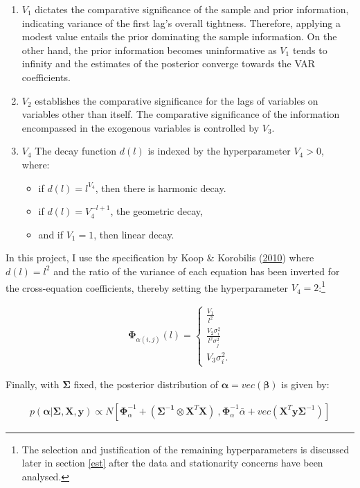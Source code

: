 \documentclass[11pt,preprint, authoryear]{elsarticle}
\numberwithin{equation}{section}
\numberwithin{figure}{section}
\numberwithin{table}{section}
\let\rmarkdownfootnote\footnote%
\def\footnote{\protect\rmarkdownfootnote}
\begin{document}
\begin{enumerate}[label=(\roman*)]
  \item $V_1$ dictates the comparative significance of the sample and prior information, indicating variance of the first lag’s overall tightness. Therefore, applying a modest value entails the prior dominating the sample information. On the other hand, the prior information becomes uninformative as $V_1$ tends to infinity and the estimates of the posterior converge towards the VAR coefficients. 
  \item $V_2$ establishes the comparative significance for the lags of variables on variables other than itself. 
The comparative significance of the information encompassed in the exogenous variables is controlled by $V_3$. 
  \item $V_4$ The decay function $d(l)$ is indexed by the hyperparameter $V_4 > 0$, where:
    \begin{itemize}
      \item if $d(l) = l^{V_4}$, then there is harmonic decay. 
      \item if $d(l) = V_4^{-l+1}$, the geometric decay,
      \item and if $V_1=1$, then linear decay. 
    \end{itemize}
\end{enumerate}

In this project, I use the specification by Koop \& Korobilis
(\protect\hyperlink{ref-koop2010}{2010}) where \(d(l) = l^2\) and the
ratio of the variance of each equation has been inverted for the
cross-equation coefficients, thereby setting the hyperparameter
\(V_4=2\):\footnote{The selection and justification of the remaining
  hyperparameters is discussed later in section \ref{est} after the data
  and stationarity concerns have been analysed.}

\begin{align}
 \bm{\Phi}_{\alpha(i,j)} (l) =
 \begin{cases} 
      \frac{V_1}{ l^2} \\
      \frac{V_2 \sigma^2_i }{l^2 \sigma^2_j}  \label{hyper2} \\
      V_3 \sigma^2_{i}. 
\end{cases}
\end{align}

Finally, with \(\bm{\Sigma}\) fixed, the posterior distribution of
\(\bm{\alpha} = vec(\bm{\beta})\) is given by:

\begin{align}
p(\bm{\alpha} | \bm{\Sigma}, \bm{X},\bm{y})  \propto  N[\bm{\Phi}_{\alpha}^{-1} + (\bm{\Sigma^{-1}} \otimes \bm{X}^T \bm{X}) \ , \bm{\Phi}_{\alpha}^{-1} \bar{\alpha} + vec(\bm{X}^T \bm{y} \bm{\Sigma}^{-1}) ] 
\end{align}
\end{document}
